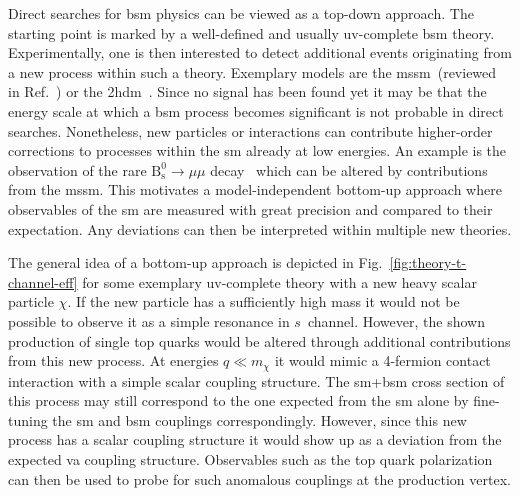 Direct searches for \gls{bsm} physics can be viewed as a top-down approach. The starting point is marked by a well-defined and usually \gls{uv}-complete \gls{bsm} theory. Experimentally, one is then interested to detect additional events originating from a new process within such a theory. Exemplary models are the \gls{mssm}~(reviewed in Ref.~\cite{Csaki:1996ks}) or the \gls{2hdm}~\cite{Branco:2011iw}. Since no signal has been found yet it may be that the energy scale at which a \gls{bsm} process becomes significant is not probable in direct searches. Nonetheless, new particles or interactions can contribute higher-order corrections to processes within the \gls{sm} already at low energies. An example is the observation of the rare $\mathrm{B}^{0}_\mathrm{s}\to\mu\mu$ decay~\cite{CMS:2014xfa} which can be altered by contributions from the \gls{mssm}. This motivates a model-independent bottom-up approach where observables of the \gls{sm} are measured with great precision and compared to their expectation. Any deviations can then be interpreted within multiple new theories. 

The general idea of a bottom-up approach is depicted in Fig.~\ref{fig:theory-t-channel-eff} for some exemplary \gls{uv}-complete theory with a new heavy scalar particle $\chi$. If the new particle has a sufficiently high mass it would not be possible to observe it as a simple resonance in $s$~channel. However, the shown production of single top quarks would be altered through additional contributions from this new process. At energies $q\ll m_{\chi}$ it would mimic a 4-fermion contact interaction with a simple scalar coupling structure. The \mbox{\gls{sm}+\gls{bsm}} cross section of this process may still correspond to the one expected from the \gls{sm} alone by fine-tuning the \gls{sm} and \gls{bsm} couplings correspondingly. However, since this new process has a scalar coupling structure it would show up as a deviation from the expected \gls{va} coupling structure. Observables such as the top quark polarization can then be used to probe for such anomalous couplings at the production vertex.

